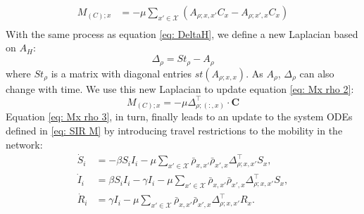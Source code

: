 \begin{equation}
    \begin{aligned}
        M_{(C);x} &= - \mu  \sum_{x' \in \mathcal{X}}\left(A_{\rho;x,x'} C_{x} - A_{\rho;x',x} C_{x} \right) \\
    \end{aligned}
    \label{eq: Mx rho 2}
\end{equation}
With the same process as equation \ref{eq: DeltaH}, we define a new Laplacian based on $A_H$:
\begin{equation}
    \Delta_\rho = St_\rho - A_\rho
\end{equation}
where $St_\rho$ is a matrix with diagonal entries $st(A_{\rho;x,x})$. As $A_\rho$, $\Delta_\rho$ can also change with time. We use this new Laplacian to update equation \ref{eq: Mx rho 2}:
\begin{equation}
    M_{(C);x} = - \mu \Delta_{\rho;(:,x)}^{\top} \cdot \mathbf{C}
    \label{eq: Mx rho 3}
\end{equation}
Equation \ref{eq: Mx rho 3}, in turn, finally leads to an update to the system ODEs defined in \ref{eq: SIR M} by introducing travel restrictions to the mobility in the network:
\begin{equation}    
\begin{aligned}
        \dot{S}_{i} &= -\beta S_{i} I_{i} - \mu \sum_{x' \in \mathcal{X}} \bar{\rho}_{x,x'} \bar{\rho}_{x',x} \Delta_{\rho;x,x'}^{\top} S_{x}, \\
        \dot{I}_{i} &= \beta S_{i} I_{i} - \gamma I_{i} - \mu \sum_{x' \in \mathcal{X}} \bar{\rho}_{x,x'} \bar{\rho}_{x',x} \Delta_{\rho;x,x'}^{\top} S_{x}, \\
        \dot{R}_{i} &= \gamma I_{i} - \mu \sum_{x' \in \mathcal{X}} \bar{\rho}_{x,x'} \bar{\rho}_{x',x} \Delta_{\rho;x,x'}^{\top} R_{x}.
\end{aligned}
\end{equation}

